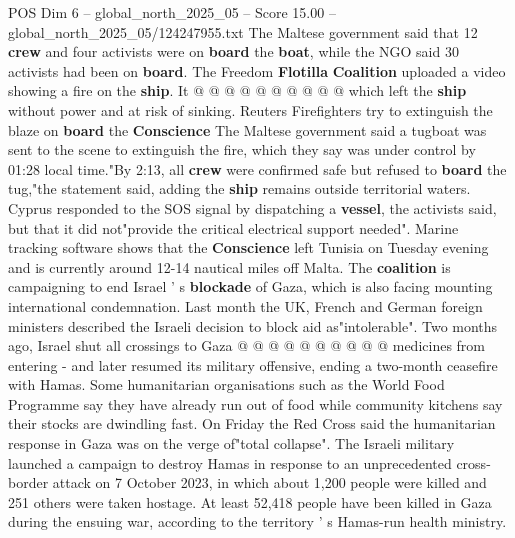 \begin{textsample}{POS Dim 6 – global\_north\_2025\_05 – Score 15.00 – global\_north\_2025\_05/124247955.txt}
The Maltese government said that 12 \textbf{crew} and four activists were on \textbf{board} the \textbf{boat}, while the NGO said 30 activists had been on \textbf{board}.
The Freedom \textbf{Flotilla} \textbf{Coalition} uploaded a video showing a fire on the \textbf{ship}.
It @ @ @ @ @ @ @ @ @ @ which left the \textbf{ship} without power and at risk of sinking.
Reuters Firefighters try to extinguish the blaze on \textbf{board} the \textbf{Conscience} The Maltese government said a tugboat was sent to the scene to extinguish the fire, which they say was under control by 01:28 local time."By 2:13, all \textbf{crew} were confirmed safe but refused to \textbf{board} the tug,"the statement said, adding the \textbf{ship} remains outside territorial waters.
Cyprus responded to the SOS signal by dispatching a \textbf{vessel}, the activists said, but that it did not"provide the critical electrical support needed".
Marine tracking software shows that the \textbf{Conscience} left Tunisia on Tuesday evening and is currently around 12-14 nautical miles off Malta.
The \textbf{coalition} is campaigning to end Israel ' s \textbf{blockade} of Gaza, which is also facing mounting international condemnation.
Last month the UK, French and German foreign ministers described the Israeli decision to block aid as"intolerable".
Two months ago, Israel shut all crossings to Gaza @ @ @ @ @ @ @ @ @ @ medicines from entering - and later resumed its military offensive, ending a two-month ceasefire with Hamas.
Some humanitarian organisations such as the World Food Programme say they have already run out of food while community kitchens say their stocks are dwindling fast.
On Friday the Red Cross said the humanitarian response in Gaza was on the verge of"total collapse".
The Israeli military launched a campaign to destroy Hamas in response to an unprecedented cross-border attack on 7 October 2023, in which about 1,200 people were killed and 251 others were taken hostage.
At least 52,418 people have been killed in Gaza during the ensuing war, according to the territory ' s Hamas-run health ministry.

\end{textsample}
